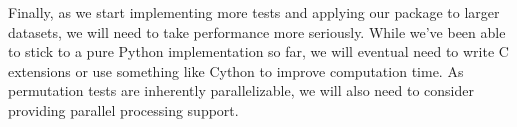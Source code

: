 Finally, as we start implementing more tests and applying our package
to larger datasets, we will need to take performance more seriously.
While we've been able to stick to a pure Python implementation so far,
we will eventual need to write C extensions or use something like
Cython to improve computation time.  As permutation tests are inherently
parallelizable, we will also need to consider providing parallel processing
support.
